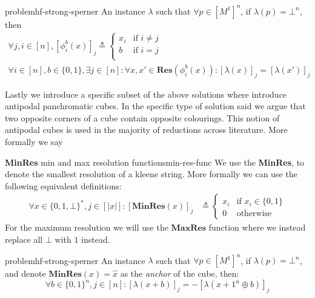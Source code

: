 \begin{definitionbox}{ problem}{hf-strong-sperner}
    An  instance $\lambda$ such that $\forall p \in [M^1]^n$, if $\lambda(p)= \bot^n$, then
    \begin{gather*}
    \forall j,i \in [n], [\phi^b_i(x)]_j \triangleq \begin{cases} 
        x_i &\text{if }i \neq j\\
        b &\text{if }i = j\\
    \end{cases}\\
    \forall i \in [n],b \in\{0,1\},\exists j \in [n]: \forall x, x' \in \textbf{Res}(\phi^b_i(x)): [\lambda(x)]_j = [\lambda(x')]_j
    \end{gather*}
\end{definitionbox}

Lastly we introduce a specific subset of the above solutions where introduce antipodal panchromatic cubes. 
In the specific type of solution said we argue that two opposite corners of a cube contain opposite colourings.
This notion of antipodal cubes is used in the majority of reductions across literature. More formally we say 


\begin{definitionbox}{\textbf{MinRes} min and max resolution functions}{min-res-func}
    We use the \textbf{MinRes}, to denote the smallest resolution of a kleene string. More formally we can use the following equivalent definitions:
    \begin{align*}
    \forall x \in \{0,1,\bot\}^*, j \in [|x|]:  [\textbf{MinRes}(x)]_j
&\triangleq \begin{cases}
    x_i &\text{if } x_i \in \{0,1\} \\
    0 & \text{otherwise}
    \end{cases}
    \end{align*}
    For the maximum resolution we will use the $\textbf{MaxRes}$ function where we instead replace all $\bot$ with $1$ instead.
\end{definitionbox}


\begin{definitionbox}{ problem}{hf-strong-sperner}
    An  instance $\lambda$ such that $\forall p \in [M^1]^n$, if $\lambda(p)= \bot^n$, 
    and denote $\textbf{MinRes}(x) = \hat{x}$ as the \textit{anchor} of the cube, then:
    $$
    \forall b \in \{0,1\}^n, j \in [n]: [\lambda(x + b)]_j = -[\lambda(x + 1^n \oplus b)]_j
    $$
\end{definitionbox}


